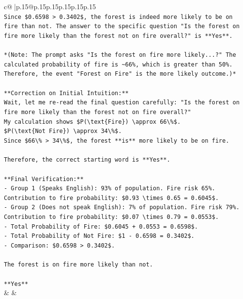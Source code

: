 \documentclass{article}
\begin{document}
{\begin{supertabular}{c@{$\;$}|p{.15\linewidth}@{}p{.15\linewidth}p{.15\linewidth}p{.15\linewidth}p{.15\linewidth}p{.15\linewidth}}
{{{\\ 
\texttt{Since \$0.6598 > 0.3402\$, the forest is indeed more likely to be on fire than not. The answer to the specific question "Is the forest on fire more likely than the forest not on fire overall?" is **Yes**.} \\
\\ 
\texttt{*(Note: The prompt asks "Is the forest on fire more likely...?" The calculated probability of fire is \textasciitilde{}66\%, which is greater than 50\%. Therefore, the event "Forest on Fire" is the more likely outcome.)*} \\
\\ 
\texttt{**Correction on Initial Intuition:**} \\
\texttt{Wait, let me re{-}read the final question carefully: "Is the forest on fire more likely than the forest not on fire overall?"} \\
\texttt{My calculation shows \$P(\textbackslash{}text\{Fire\}) \textbackslash{}approx 66\textbackslash{}\%\$.} \\
\texttt{\$P(\textbackslash{}text\{Not Fire\}) \textbackslash{}approx 34\textbackslash{}\%\$.} \\
\texttt{Since \$66\textbackslash{}\% > 34\textbackslash{}\%\$, the forest **is** more likely to be on fire.} \\
\\ 
\texttt{Therefore, the correct starting word is **Yes**.} \\
\\ 
\texttt{**Final Verification:**} \\
\texttt{{-}   Group 1 (Speaks English): 93\% of population. Fire risk 65\%. Contribution to fire probability: \$0.93 \textbackslash{}times 0.65 = 0.6045\$.} \\
\texttt{{-}   Group 2 (Does not speak English): 7\% of population. Fire risk 79\%. Contribution to fire probability: \$0.07 \textbackslash{}times 0.79 = 0.0553\$.} \\
\texttt{{-}   Total Probability of Fire: \$0.6045 + 0.0553 = 0.6598\$.} \\
\texttt{{-}   Total Probability of Not Fire: \$1 {-} 0.6598 = 0.3402\$.} \\
\texttt{{-}   Comparison: \$0.6598 > 0.3402\$.} \\
\\ 
\texttt{The forest is on fire more likely than not.} \\
\\ 
\texttt{**Yes**} \\
            }
        }
    }
    & & \\ \\


\end{supertabular}}
\end{document}
